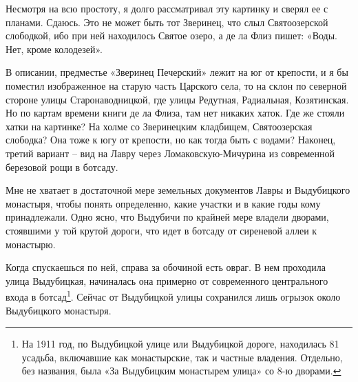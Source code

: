 Несмотря на всю простоту, я долго рассматривал эту картинку и сверял ее с планами. Сдаюсь. Это не может быть тот Зверинец, что слыл Святоозерской слободкой, ибо при ней находилось Святое озеро, а де ла Флиз пишет: «Воды. Нет, кроме колодезей».

В описании, предместье «Зверинец Печерский» лежит на юг от крепости, и я бы поместил изображенное на старую часть Царского села, то на склон по северной стороне улицы Старонаводницкой, где улицы Редутная, Радиальная, Козятинская. Но по картам времени книги де ла Флиза, там нет никаких хаток. Где же стояли хатки на картинке? На холме со Зверинецким кладбищем, Святоозерская слободка?  Она тоже к югу от крепости, но как тогда быть с водами? Наконец, третий вариант – вид на Лавру через Ломаковскую-Мичурина из современной березовой рощи в ботсаду.




Мне не хватает в достаточной мере земельных документов Лавры и Выдубицкого монастыря, чтобы понять определенно, какие участки и в какие годы кому принадлежали. Одно ясно, что Выдубичи по крайней мере владели дворами, стоявшими у той крутой дороги, что идет в ботсаду от сиреневой аллеи к монастырю. 

Когда спускаешься по ней, справа за обочиной есть овраг. В нем проходила улица Выдубицкая, начиналась она примерно от современного центрального входа в ботсад\footnote{На 1911 год, по Выдубицкой улице или Выдубицкой дороге, находилась 81 усадьба, включавшие как монастырские, так и частные владения. Отдельно, без названия, была «За Выдубицким монастырем улица» со 8-ю дворами.}. Сейчас от Выдубицкой улицы сохранился лишь огрызок около Выдубицкого монастыря.

